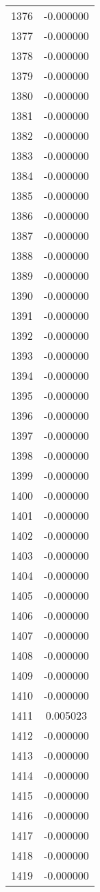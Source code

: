 \documentclass[12pt]{article}
\begin{document}
\begin{longtable}{@{}cc@{}}
1376 & -0.000000 \\
1377 & -0.000000 \\
1378 & -0.000000 \\
1379 & -0.000000 \\
1380 & -0.000000 \\
1381 & -0.000000 \\
1382 & -0.000000 \\
1383 & -0.000000 \\
1384 & -0.000000 \\
1385 & -0.000000 \\
1386 & -0.000000 \\
1387 & -0.000000 \\
1388 & -0.000000 \\
1389 & -0.000000 \\
1390 & -0.000000 \\
1391 & -0.000000 \\
1392 & -0.000000 \\
1393 & -0.000000 \\
1394 & -0.000000 \\
1395 & -0.000000 \\
1396 & -0.000000 \\
1397 & -0.000000 \\
1398 & -0.000000 \\
1399 & -0.000000 \\
1400 & -0.000000 \\
1401 & -0.000000 \\
1402 & -0.000000 \\
1403 & -0.000000 \\
1404 & -0.000000 \\
1405 & -0.000000 \\
1406 & -0.000000 \\
1407 & -0.000000 \\
1408 & -0.000000 \\
1409 & -0.000000 \\
1410 & -0.000000 \\
1411 & 0.005023 \\
1412 & -0.000000 \\
1413 & -0.000000 \\
1414 & -0.000000 \\
1415 & -0.000000 \\
1416 & -0.000000 \\
1417 & -0.000000 \\
1418 & -0.000000 \\
1419 & -0.000000 \\

\end{longtable}
\end{document}
